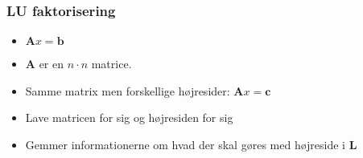 \documentclass[a4wide,10pt]{article}
\begin{document}
\subsubsection{LU faktorisering} %
\label{ssub:lu_faktorisering}
\begin{itemize}
	\item $\mathbf{A}x=\mathbf{b}$
	\item $\textbf{A}$ er en $n \cdot n$ matrice.
	\item Samme matrix men forskellige højresider: $\mathbf{A}x=\mathbf{c}$
	\item Lave matricen for sig og højresiden for sig
	\item Gemmer informationerne om hvad der skal gøres med højreside i $\mathbf{L}$
\end{itemize}


\end{document}
